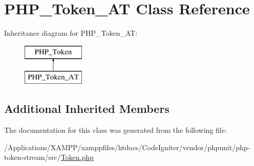 \hypertarget{class_p_h_p___token___a_t}{}\section{P\+H\+P\+\_\+\+Token\+\_\+\+AT Class Reference}
\label{class_p_h_p___token___a_t}
Inheritance diagram for P\+H\+P\+\_\+\+Token\+\_\+\+AT\+:\begin{figure}[H]
\begin{center}
\leavevmode
\includegraphics[height=2.000000cm]{class_p_h_p___token___a_t}
\end{center}
\end{figure}
\subsection*{Additional Inherited Members}


The documentation for this class was generated from the following file\+:\begin{DoxyCompactItemize}
\item 
/\+Applications/\+X\+A\+M\+P\+P/xamppfiles/htdocs/\+Code\+Igniter/vendor/phpunit/php-\/token-\/stream/src/\mbox{\hyperlink{_token_8php}{Token.\+php}}\end{DoxyCompactItemize}
